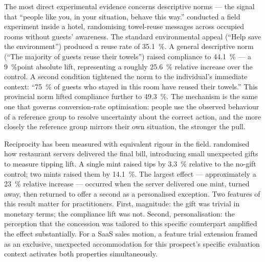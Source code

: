 The most direct experimental evidence concerns descriptive norms --- the signal that
``people like you, in your situation, behave this way.'' \textcite{goldstein2008field}
conducted a field experiment inside a hotel, randomising towel-reuse messages across
occupied rooms without guests' awareness. The standard environmental appeal (``Help save
the environment'') produced a reuse rate of \qty{35.1}{\percent}. A general descriptive
norm (``The majority of guests reuse their towels'') raised compliance to
\qty{44.1}{\percent} --- a \qty{9}{\percent}point absolute lift, representing a roughly
\qty{25.6}{\percent} relative increase over the control.
A second condition tightened the norm to the individual's immediate context: ``\qty{75}{\percent}
of guests who stayed in this room have reused their towels.'' This provincial norm lifted
compliance further to \qty{49.3}{\percent}.
The mechanism is the same one that governs conversion-rate optimisation: people use
the observed behaviour of a reference group to resolve uncertainty about the correct
action, and the more closely the reference group mirrors their own situation, the
stronger the pull.

Reciprocity has been measured with equivalent rigour in the field.
\textcite{strohmetz2002field} randomised how restaurant servers delivered the final bill,
introducing small unexpected gifts to measure tipping lift. A single mint raised tips by
\qty{3.3}{\percent} relative to the no-gift control; two mints raised them by
\qty{14.1}{\percent}.
The largest effect --- approximately a \qty{23}{\percent} relative increase --- occurred
when the server delivered one mint, turned away, then returned to offer a second as a
personalised exception.
Two features of this result matter for practitioners. First, magnitude: the gift was
trivial in monetary terms; the compliance lift was not. Second, personalisation: the
perception that the concession was tailored to this specific counterpart amplified the
effect substantially. For a SaaS sales motion, a feature trial extension framed as an
exclusive, unexpected accommodation for this prospect's specific evaluation context
activates both properties simultaneously.

